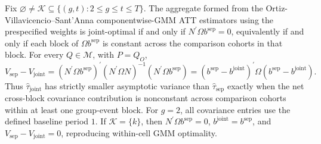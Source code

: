 Fix \(\varnothing\ne\mathcal K\subseteq\{(g,t):2\le g\le t\le T\}\). The aggregate formed from the Ortiz-Villavicencio--Sant'Anna componentwise-GMM ATT estimators using the prespecified weights is joint-optimal if and only if \(N^{\prime}\Omega b^{\mathrm{sep}}=0\), equivalently if and only if each block of \(\Omega b^{\mathrm{sep}}\) is constant across the comparison cohorts in that block. For every \(Q\in\mathcal M\), with \(P=Q_O\), \[V_{\mathrm{sep}}-V_{\mathrm{joint}}=(N^{\prime}\Omega b^{\mathrm{sep}})^{\prime}(N^{\prime}\Omega N)^{-1}(N^{\prime}\Omega b^{\mathrm{sep}})=(b^{\mathrm{sep}}-b^{\mathrm{joint}})^{\prime}\Omega(b^{\mathrm{sep}}-b^{\mathrm{joint}}).\] Thus \(\widehat\tau_{\mathrm{joint}}\) has strictly smaller asymptotic variance than \(\widehat\tau_{\mathrm{sep}}\) exactly when the net cross-block covariance contribution is nonconstant across comparison cohorts within at least one group-event block. For \(g=2\), all covariance entries use the defined baseline period \(1\). If \(\mathcal K=\{k\}\), then \(N^{\prime}\Omega b^{\mathrm{sep}}=0\), \(b^{\mathrm{joint}}=b^{\mathrm{sep}}\), and \(V_{\mathrm{sep}}-V_{\mathrm{joint}}=0\), reproducing within-cell GMM optimality.